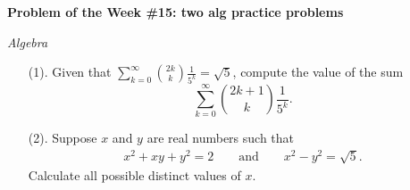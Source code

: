 \begin{potw}\vspace{5pt}
{\large\textbf{Problem of the Week \#15: two alg practice problems}}\vspace{5pt}

\textit{Algebra}
\begin{enumerate}
    \item [(1).] Given that $\sum_{k=0}^{\infty}\binom{2k}{k}\frac{1}{5^k}=\sqrt{5}$, compute the value of the sum 
    \[\sum_{k=0}^{\infty}\binom{2k+1}{k}\frac{1}{5^k}.\]
    \item [(2).] Suppose $x$ and $y$ are real numbers such that 
    \begin{align*}
        x^2+xy+y^2=2 \qquad\text{and} \qquad x^2-y^2=\sqrt{5}.
    \end{align*}
    Calculate all possible distinct values of $x$.
\end{enumerate}
\end{potw}\V

